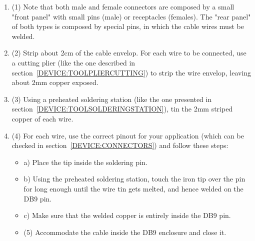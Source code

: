 \begin{enumerate}
  \item (1) Note that both male and female connectors are composed by a small "front panel" with small pins (male) or receptacles (females). The "rear panel" of both types is composed by special pins, in which the cable wires must be welded.
  \item (2) Strip about 2cm of the cable envelop. For each wire to be connected, use a cutting plier (like the one described in section~\ref{DEVICE:TOOLPLIERCUTTING}) to strip the wire envelop, leaving about 2mm copper exposed.
  \item (3) Using a preheated soldering station (like the one presented in section~\ref{DEVICE:TOOLSOLDERINGSTATION}), tin the 2mm striped copper of each wire.
  \item (4) For each wire, use the correct pinout for your application (which can be checked in section~\ref{DEVICE:CONNECTORS}) and follow these steps:
  \begin{itemize}
    \item a) Place the tip inside the soldering pin.
    \item b) Using the preheated soldering station, touch the iron tip over the pin for long enough until the wire tin gets melted, and hence welded on the DB9 pin.
    \item c) Make sure that the welded copper is entirely inside the DB9 pin.
  \item (5) Accommodate the cable inside the DB9 enclosure and close it.
  \end{itemize}
\end{enumerate}
